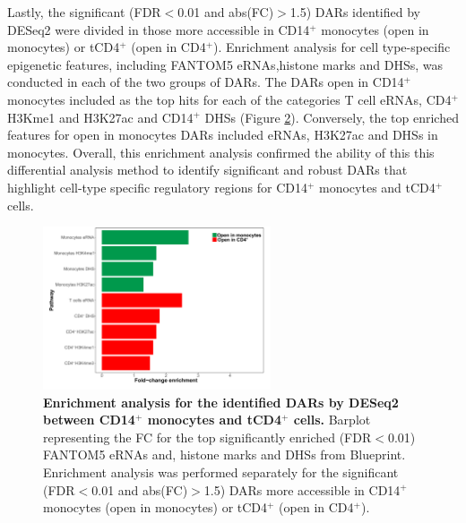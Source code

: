 \begin{figure}[htbp]
\label{figure:QC_quantile_DAR_and_DESeq2_comparison}
\end{figure} 

Lastly, the significant (FDR$<$0.01 and abs(FC)$>$1.5) DARs identified by DESeq2 were divided in those more accessible in CD14$^+$ monocytes (open in monocytes) or tCD4$^+$ (open in CD4$^+$). Enrichment analysis for cell type-specific epigenetic features, including FANTOM5 eRNAs,histone marks and DHSs, was conducted in each of the two groups of DARs. The DARs open in CD14$^+$ monocytes included as the top hits for each of the categories T cell eRNAs, CD4$^+$ H3Kme1 and H3K27ac and CD14$^+$ DHSs (Figure \ref{figure:Enrichment_analysis_of_DARs_by_DESeq2}). Conversely, the top enriched features for open in monocytes DARs included eRNAs, H3K27ac and DHSs in monocytes. Overall, this enrichment analysis confirmed the ability of this this differential analysis method to identify significant and robust DARs that highlight cell-type specific regulatory regions for CD14$^+$ monocytes and tCD4$^+$ cells.


\begin{figure}[htbp]
\centering
\includegraphics[width=0.6\textwidth]{./Results1/pdfs/ATAC_CD4vsCD14_deseq_features_enrichment_barplot}
\caption[Enrichment analysis for the significant DARs identified by DESeq2 between CD14$^+$ monocytes and tCD4$^+$ cells.]{\textbf{Enrichment analysis for the identified DARs by DESeq2 between CD14$^+$ monocytes and tCD4$^+$ cells.} Barplot representing the FC for the top significantly enriched (FDR$<$0.01) FANTOM5 eRNAs and, histone marks and DHSs from Blueprint. Enrichment analysis was performed separately for the significant (FDR$<$0.01 and abs(FC)$>$1.5) DARs more accessible in CD14$^+$ monocytes (open in monocytes) or tCD4$^+$ (open in CD4$^+$).}
\label{figure:Enrichment_analysis_of_DARs_by_DESeq2}
\end{figure} 

